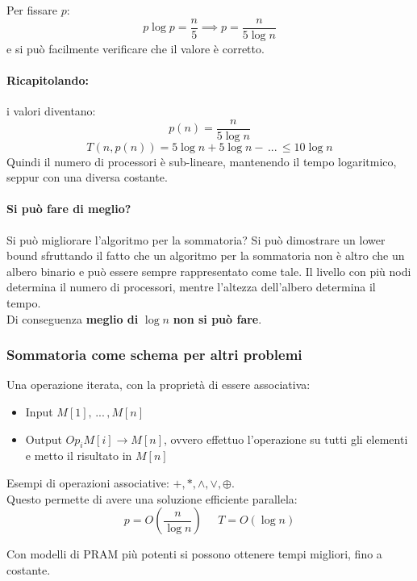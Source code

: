 Per fissare $p$: 
$$ p \log p = \frac{n}{5} \implies p = \frac{n}{5 \log n} $$
e si può facilmente verificare che il valore è corretto.

\paragraph{Ricapitolando:} i valori diventano:
$$ p(n) = \frac{n}{5 \log n} $$
$$ T(n, p(n)) = 5 \log n + 5 \log n - \, ... \, \leq 10 \log n $$
Quindi il numero di processori è sub-lineare, mantenendo il tempo logaritmico, seppur con una diversa costante.

\vfill 

\paragraph{Si può fare di meglio?} Si può migliorare l'algoritmo per la sommatoria? Si può dimostrare un lower bound sfruttando il fatto che un algoritmo per la sommatoria non è altro che un albero binario e può essere sempre rappresentato come tale. Il livello con più nodi determina il numero di processori, mentre l'altezza dell'albero determina il tempo.\\

Di conseguenza \textbf{meglio di} $\log n$ \textbf{non si può fare}.\\


\subsubsection{Sommatoria come schema per altri problemi}

Una operazione iterata, con la proprietà di essere associativa:
\begin{itemize}
	\item Input $M[1], \, ... \, , M[n]$
	\item Output $Op_i M[i] \rightarrow M[n]$, ovvero effettuo l'operazione su tutti gli elementi e metto il risultato in $M[n]$
\end{itemize}

Esempi di operazioni associative: $+,\ast,\wedge, \vee,\oplus$.\\

Questo permette di avere una soluzione efficiente parallela: 
$$ p = O \left(\frac{n}{\log n}\right) \;\;\;\;\; T = O(\log n) $$

Con modelli di PRAM più potenti si possono ottenere tempi migliori, fino a costante.\\

